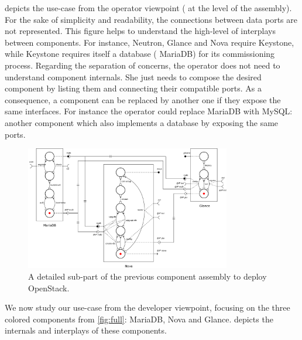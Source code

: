  depicts the use-case from the operator viewpoint (\ie
at the level of the \mad assembly). For the sake of simplicity and
readability, the connections between data ports are not
represented. This figure helps to understand the high-level of
interplays between components. For instance, Neutron, Glance and Nova
require Keystone, while Keystone requires itself a database (\ie
MariaDB) for its commissioning process. Regarding the separation of
concerns, the operator does not need to understand component
internals. She just needs to compose the desired component by listing
them and connecting their compatible ports. As a consequence, a
component can be replaced by another one if they expose the same
interfaces. For instance the operator could replace MariaDB with
MySQL: another component which also implements a database by exposing
the same ports.

\begin{figure}[t]
  \begin{center}
    \includegraphics[width=0.8\textwidth]{./images/sub.pdf}
    \caption{A detailed sub-part of the previous component assembly to deploy
    OpenStack.}
    \label{fig:sub}
  \end{center}
\end{figure}

We now study our use-case from the developer viewpoint, focusing on
the three colored components from \cref{fig:full}: MariaDB, Nova and
Glance.   depicts the internals and interplays of these
components.

